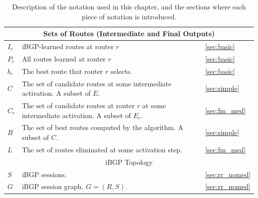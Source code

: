 \begin{table}[t]
\begin{small}
\begin{center}
\begin{tabular}{|lp{4in}l|}
\multicolumn{3}{c}{{\sc Sets of Routes (Intermediate and Final 
Outputs)}} \\ \hline
$I_r$ & iBGP-learned routes at router $r$ & \ref{sec:basic} \\
$P_r$ & All routes learned at router $r$ & \ref{sec:basic} \\
$b_r$ & The best route that router $r$ selects. & \ref{sec:basic}  \\ 
$C$ & The set of candidate routes at some intermediate activation. A
subset of $E$.& \ref{sec:simple} \\
$C_r$ & The set of candidate routes at router $r$ at some intermediate
activation. A subset of $E_r$.& \ref{sec:fm_med} \\
$B$ & The set of best routes computed by the algorithm.  A subset of
$C$. & \ref{sec:simple} \\
$L$ & The set of routes eliminated at some activation step. &
\ref{sec:fm_med} \\
\hline


\multicolumn{3}{c}{{\sc iBGP Topology}} \\ \hline
$S$ & iBGP sessions. & \ref{sec:rr_nomed} \\
$G$ & iBGP session graph. $G = (R,S)$. & \ref{sec:rr_nomed} \\
\hline

\end{tabular}
\end{center}
\end{small}
\caption{Description of the notation used in this chapter, and the
  sections where each piece of notation is introduced.}
\label{tab:notation}
\end{table}


